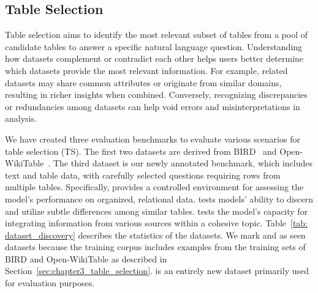 \subsection{Table Selection}
Table selection aims to identify the most relevant subset of tables from a pool of candidate tables to answer a specific natural language question. Understanding how datasets complement or contradict each other helps users better determine which datasets provide the most relevant information. For example, related datasets may share common attributes or originate from similar domains, resulting in richer insights when combined. Conversely, recognizing discrepancies or redundancies among datasets can help void errors and misinterpretations in analysis. 

We have created three evaluation benchmarks to evaluate various scenarios for table selection (TS). The first two datasets are derived from BIRD~\citep{bird} and Open-WikiTable~\citep{open_wikitable}. The third dataset is our newly annotated benchmark, which includes text and table data, with carefully selected questions requiring rows from multiple tables. Specifically, \birdselect provides a controlled environment for assessing the model's performance on organized, relational data. \openwikiselect tests models' ability to discern and utilize subtle differences among similar tables. \wikipage tests the model's capacity for integrating information from various sources within a cohesive topic.
%
Table~\ref{tab: dataset_discovery} describes the statistics of the datasets. We mark \birdselect and \openwikiselect as seen datasets because the training corpus includes examples from the training sets of BIRD and Open-WikiTable as described in Section~\ref{sec:chapter3_table_selection}. \wikipage is an entirely new dataset primarily used for evaluation purposes.

